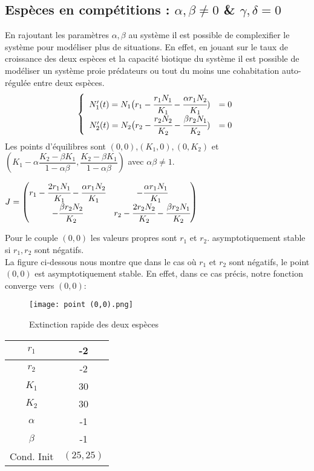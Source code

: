 \documentclass[11pt]{article}
\begin{document}
\subsection{Espèces en compétitions : $\alpha,\beta \ne 0$ \& $\gamma,\delta = 0$ }
En rajoutant les paramètres $\alpha,\beta$ au système il est possible de complexifier le système pour modéliser plus de situations. En effet, en jouant sur le taux de croissance des deux espèces et la capacité biotique du système il est possible de modéliser un système proie prédateurs ou tout du moins une cohabitation auto-régulée entre deux espèces.
\[
\left\{
\begin{array}{r c}

N_1'(t) = N_1 \big( r_1 - \cfrac{r_1N_1}{K_1} - \cfrac{\alpha r_1N_2}{K_1}) & = 0 \\
N_2'(t) = N_2 \big( r_2 - \cfrac{r_2N_2}{K_2} - \cfrac{\beta r_2N_1}{K_2}) & = 0
\end{array}
\right.
\]
Les points d'équilibres sont $(0,0)$,$(K_1,0),(0,K_2)$ et $(K_1 - \alpha \dfrac{K_2-\beta K_1}{1 -\alpha \beta},\dfrac{K_2-\beta K_1}{1 -\alpha \beta})$ avec $\alpha \beta \ne 1$.
\begin{center}
\begin{math}
J = 
\begin{pmatrix} 
r_1 - \cfrac{2r_1N_1}{K_1} - \cfrac{\alpha r_1N_2}{K_1}  & - \cfrac{\alpha r_1N_1}{K_1}  \\
- \cfrac{\beta r_2N_2}{K_2}    & r_2 - \cfrac{2r_2N_2}{K_2} - \cfrac{\beta r_2N_1}{K_2}   \\
\end{pmatrix}
\end{math}
\end{center}

Pour le couple $(0,0)$ les valeurs propres sont $r_1$ et $r_2$. asymptotiquement stable si $r_1,r_2$ sont négatifs. \\

La figure ci-dessous nous montre que dans le cas où $r_1$ et $r_2$ sont négatifs, le point $(0,0)$  est asymptotiquement stable. En effet, dans ce cas précis, notre fonction converge vers $(0,0)$:
\begin{center}
\begin{figure}[H]
    \centering
    \texttt{[image: point (0,0).png]}
    \caption{Extinction rapide des deux espèces}
    \label{1}
\end{figure}

\begin{tabular}{c|c}
     $r_1$&-2  \\
     \hline
     $r_2$&-2 \\
     \hline
     $K_1$&30 \\
     \hline
     $K_2$&30\\
     \hline
     $\alpha$&-1\\
     \hline
     $\beta$&-1\\
     \hline
     Cond. Init& $(25,25)$
\end{tabular}
\end{center}
\end{document}
